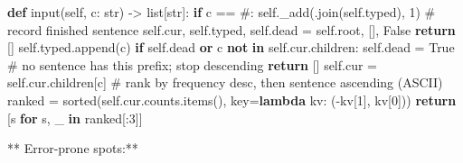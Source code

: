 \documentclass[11pt]{article}
\newenvironment{Shaded}{\begin{snugshade}}{\end{snugshade}}
\newcommand{\BuiltInTok}[1]{\textcolor[rgb]{0.50,0.55,0.55}{#1}}
\newcommand{\CommentTok}[1]{\textcolor[rgb]{0.48,0.49,0.49}{#1}}
\newcommand{\ControlFlowTok}[1]{\textcolor[rgb]{0.99,0.74,0.29}{\textbf{#1}}}
\newcommand{\DecValTok}[1]{\textcolor[rgb]{0.96,0.45,0.00}{#1}}
\newcommand{\KeywordTok}[1]{\textcolor[rgb]{0.81,0.81,0.76}{\textbf{#1}}}
\newcommand{\NormalTok}[1]{\textcolor[rgb]{0.81,0.81,0.76}{#1}}
\newcommand{\OperatorTok}[1]{\textcolor[rgb]{0.81,0.81,0.76}{#1}}
\newcommand{\StringTok}[1]{\textcolor[rgb]{0.96,0.31,0.31}{#1}}
\newcommand{\VariableTok}[1]{\textcolor[rgb]{0.15,0.68,0.68}{#1}}
\begin{document}
\begin{Shaded}
\begin{Highlighting}[]
    \KeywordTok{def} \BuiltInTok{input}\NormalTok{(}\VariableTok{self}\NormalTok{, c: }\BuiltInTok{str}\NormalTok{) }\OperatorTok{{-}\textgreater{}} \BuiltInTok{list}\NormalTok{[}\BuiltInTok{str}\NormalTok{]:}
        \ControlFlowTok{if}\NormalTok{ c }\OperatorTok{==} \StringTok{\textquotesingle{}\#\textquotesingle{}}\NormalTok{:}
            \VariableTok{self}\NormalTok{.\_add(}\StringTok{\textquotesingle{}\textquotesingle{}}\NormalTok{.join(}\VariableTok{self}\NormalTok{.typed), }\DecValTok{1}\NormalTok{)   }\CommentTok{\# record finished sentence}
            \VariableTok{self}\NormalTok{.cur, }\VariableTok{self}\NormalTok{.typed, }\VariableTok{self}\NormalTok{.dead }\OperatorTok{=} \VariableTok{self}\NormalTok{.root, [], }\VariableTok{False}
            \ControlFlowTok{return}\NormalTok{ []}
        \VariableTok{self}\NormalTok{.typed.append(c)}
        \ControlFlowTok{if} \VariableTok{self}\NormalTok{.dead }\KeywordTok{or}\NormalTok{ c }\KeywordTok{not} \KeywordTok{in} \VariableTok{self}\NormalTok{.cur.children:}
            \VariableTok{self}\NormalTok{.dead }\OperatorTok{=} \VariableTok{True}        \CommentTok{\# no sentence has this prefix; stop descending}
            \ControlFlowTok{return}\NormalTok{ []}
        \VariableTok{self}\NormalTok{.cur }\OperatorTok{=} \VariableTok{self}\NormalTok{.cur.children[c]}
        \CommentTok{\# rank by frequency desc, then sentence ascending (ASCII)}
\NormalTok{        ranked }\OperatorTok{=} \BuiltInTok{sorted}\NormalTok{(}\VariableTok{self}\NormalTok{.cur.counts.items(), key}\OperatorTok{=}\KeywordTok{lambda}\NormalTok{ kv: (}\OperatorTok{{-}}\NormalTok{kv[}\DecValTok{1}\NormalTok{], kv[}\DecValTok{0}\NormalTok{]))}
        \ControlFlowTok{return}\NormalTok{ [s }\ControlFlowTok{for}\NormalTok{ s, \_ }\KeywordTok{in}\NormalTok{ ranked[:}\DecValTok{3}\NormalTok{]]}
\end{Highlighting}
\end{Shaded}

** Error-prone spots:**
\end{document}
